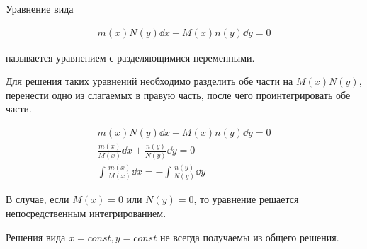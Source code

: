 
\begin{definition}
  Уравнение вида

  \begin{align*}
    m(x) N(y) \dd x + M(x) n(y) \dd y = 0
  \end{align*}

  называется уравнением с разделяющимися переменными.
\end{definition}

Для решения таких уравнений необходимо разделить обе части на \(M(x) N(y)\),
перенести одно из слагаемых в правую часть, после чего проинтегрировать обе
части.

\begin{align*}
  m(x) N(y) \dd x + M(x) n(y) \dd y = 0 \\
  \frac{m(x)}{M(x)} \dd x + \frac{n(y)}{N(y)} \dd y = 0 \\
  \int \frac{m(x)}{M(x)} \dd x = - \int \frac{n(y)}{N(y)} \dd y 
\end{align*}

\begin{remark}
  В случае, если \(M(x) = 0\) или \(N(y) = 0\), то уравнение решается
  непосредственным интегрированием.
\end{remark}

\begin{remark}
  Решения вида \(x = const, y = const\) не всегда получаемы из общего решения.
\end{remark}


